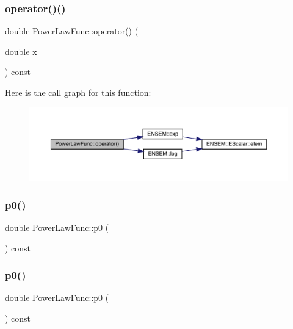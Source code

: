 \subsubsection{\texorpdfstring{operator()()}{operator()()}\hspace{0.1cm}{\footnotesize\ttfamily [2/2]}}
{\footnotesize\ttfamily double Power\+Law\+Func\+::operator() (\begin{DoxyParamCaption}\item[{double}]{x }\end{DoxyParamCaption}) const\hspace{0.3cm}{\ttfamily [inline]}}

Here is the call graph for this function\+:
\nopagebreak
\begin{figure}[H]
\begin{center}
\leavevmode
\includegraphics[width=350pt]{d3/db8/classPowerLawFunc_a39c1ca06f0f0f4b7874be6fe8c67f3e3_cgraph}
\end{center}
\end{figure}
\mbox{\label{classPowerLawFunc_aa1eab94d7a8d404080ed25fde7dbd889}} 
\subsubsection{\texorpdfstring{p0()}{p0()}\hspace{0.1cm}{\footnotesize\ttfamily [1/2]}}
{\footnotesize\ttfamily double Power\+Law\+Func\+::p0 (\begin{DoxyParamCaption}{ }\end{DoxyParamCaption}) const\hspace{0.3cm}{\ttfamily [inline]}}

\mbox{\label{classPowerLawFunc_aa1eab94d7a8d404080ed25fde7dbd889}} 
\subsubsection{\texorpdfstring{p0()}{p0()}\hspace{0.1cm}{\footnotesize\ttfamily [2/2]}}
{\footnotesize\ttfamily double Power\+Law\+Func\+::p0 (\begin{DoxyParamCaption}{ }\end{DoxyParamCaption}) const\hspace{0.3cm}{\ttfamily [inline]}}

